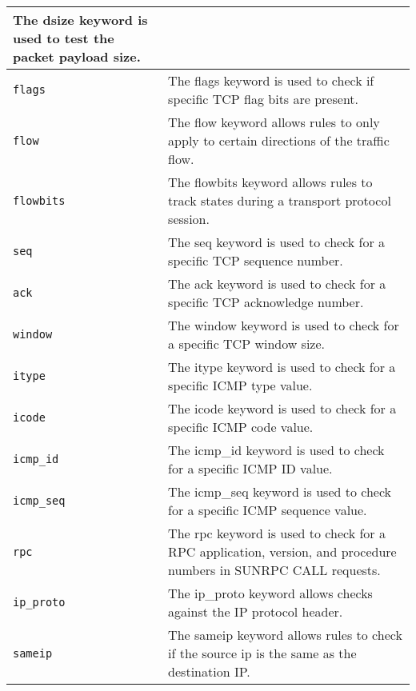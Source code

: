 \documentclass[english]{report}
\begin{document}
\begin{center}
\begin{longtable}[h]{| p{1in} | p{4.5in} |}
The dsize keyword is used to test the packet payload size. \\

\hline
\texttt{flags} &

The flags keyword is used to check if specific TCP flag bits are present. \\

\hline
\texttt{flow} &

The flow keyword allows rules to only apply to certain directions of the
traffic flow. \\

\hline
\texttt{flowbits} &

The flowbits keyword allows rules to track states during a transport protocol
session. \\

\hline
\texttt{seq} &

The seq keyword is used to check for a specific TCP sequence number. \\

\hline
\texttt{ack} &

The ack keyword is used to check for a specific TCP acknowledge number. \\

\hline
\texttt{window} &

The window keyword is used to check for a specific TCP window size. \\

\hline
\texttt{itype} &

The itype keyword is used to check for a specific ICMP type value. \\

\hline
\texttt{icode} &

The icode keyword is used to check for a specific ICMP code value. \\

\hline
\texttt{icmp\_id} &

The icmp\_id keyword is used to check for a specific ICMP ID value. \\

\hline
\texttt{icmp\_seq} &

The icmp\_seq keyword is used to check for a specific ICMP sequence value. \\

\hline
\texttt{rpc} &

The rpc keyword is used to check for a RPC application, version, and procedure
numbers in SUNRPC CALL requests. \\

\hline
\texttt{ip\_proto} &

The ip\_proto keyword allows checks against the IP protocol header. \\

\hline
\texttt{sameip} &

The sameip keyword allows rules to check if the source ip is the same as the
destination IP. \\

\hline
\end{longtable}
\end{center}
\end{document}
